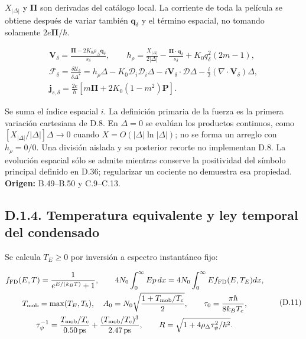 \documentclass[
  spanish,
  10pt,
  a4paper,
]{article}
\begin{document}
\(X_{|\Delta|}\) y \(\boldsymbol\Pi\) son derivadas del catálogo local.
La corriente de toda la película se obtiene después de variar también
\(\mathbf q_\delta\) y el término espacial, no tomando solamente
\(2e\boldsymbol\Pi/\hbar\).

\[
\begin{gathered}
\mathbf V_\delta=\frac{\boldsymbol\Pi-2K_0\rho_\Delta\mathbf q_\delta}{s_\delta},\qquad
h_\rho=\frac{X_{|\Delta|}}{2|\Delta|}-\frac{\boldsymbol\Pi\cdot\mathbf q_\delta}{s_\delta}
+K_0q_\delta^2(2m-1),\\
\mathscr F_\delta=\frac{\delta\mathcal U_\delta}{\delta\Delta^*}
=h_\rho\Delta-K_0\mathcal D_i\mathcal D_i\Delta
-i\mathbf V_\delta\cdot\boldsymbol{\mathcal D}\Delta
-\frac{i}{2}(\nabla\cdot\mathbf V_\delta)\Delta,\\
\mathbf j_{s,\delta}=\frac{2e}{\hbar}
\left[m\boldsymbol\Pi+2K_0(1-m^2)\mathbf P\right].
\end{gathered}\tag{D.10}
\]

Se suma el índice espacial \(i\). La definición primaria de la fuerza es
la primera variación cartesiana de D.8. En \(\Delta=0\) se evalúan los
productos continuos, como \([X_{|\Delta|}/|\Delta|]\Delta\to0\) cuando
\(X=O(|\Delta|\ln|\Delta|)\); no se forma un arreglo con \(h_\rho=0/0\).
Una división aislada y su posterior recorte no implementan D.8. La
evolución espacial sólo se admite mientras conserve la positividad del
símbolo principal definido en D.36; regularizar un cociente no demuestra
esa propiedad. \textbf{Origen:} B.49--B.50 y C.9--C.13.

\subsection{D.1.4. Temperatura equivalente y ley temporal del
condensado}\label{d.1.4.-temperatura-equivalente-y-ley-temporal-del-condensado}

Se calcula \(T_E\geq0\) por inversión a espectro instantáneo fijo:

\[
\begin{gathered}
f_{\rm FD}(E,T)=\frac{1}{e^{E/(k_BT)}+1},\qquad
4N_0\int_0^\infty E p\,dx
=4N_0\int_0^\infty E f_{\rm FD}(E,T_E)dx,\\
T_{\rm mob}=\max(T_E,T_b),\quad
A_0=N_0\sqrt{\frac{1+T_{\rm mob}/T_c}{2}},\qquad
\tau_0=\frac{\pi\hbar}{8k_BT_c},\\
\tau_\psi^{-1}=\frac{T_{\rm mob}/T_c}{0.50\,{\rm ps}}
+\frac{(T_{\rm mob}/T_c)^3}{2.47\,{\rm ps}},\qquad
R=\sqrt{1+4\rho_\Delta\tau_\psi^2/\hbar^2}.
\end{gathered}\tag{D.11}
\]
\end{document}
